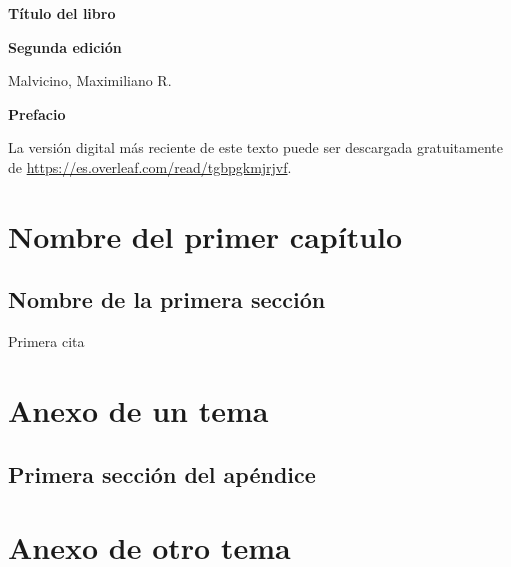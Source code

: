 \documentclass[a5paper,12pt,twoside]{book}
\begin{document}
\pagestyle{fancy}
\fancyhf{}
\chead{\scriptsize \nouppercase\rightmark}
\cfoot{\scriptsize \thepage}
\renewcommand{\headrulewidth}{0pt}

\frontmatter
% 

\begin{center}
    \begin{Huge}
        \textbf{Título del libro}
    \end{Huge}

    \vspace{1cm}
    \textbf{Segunda edición}
    \vspace{2cm}

    \begin{Large}
        Malvicino, Maximiliano R.
    \end{Large}
\end{center}

\clearpage
\noindent
\textbf{Prefacio}

La versión digital más reciente de este texto puede ser descargada gratuitamente de \url{https://es.overleaf.com/read/tgbpgkmjrjvf}.

\renewcommand{\spanishappendixname}{Anexo}
\tableofcontents

\mainmatter
{}


\chapter{Nombre del primer capítulo}


\section{Nombre de la primera sección}

Primera cita \parencite{lamport}

\renewcommand{\bibname}{\begin{center}Referencias\end{center}}
\printbibliography
{}

\appendix


\chapter{Anexo de un tema}


\section{Primera sección del apéndice}


\chapter{Anexo de otro tema}
\end{document}
